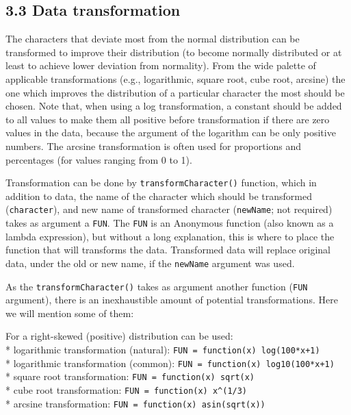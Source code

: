\documentclass[
]{article}
\begin{document}
\hypertarget{data-transformation}{%
\subsection{3.3 Data transformation}\label{data-transformation}}

The characters that deviate most from the normal distribution can be
transformed to improve their distribution (to become normally
distributed or at least to achieve lower deviation from normality). From
the wide palette of applicable transformations (e.g., logarithmic,
square root, cube root, arcsine) the one which improves the distribution
of a particular character the most should be chosen. Note that, when
using a log transformation, a constant should be added to all values to
make them all positive before transformation if there are zero values in
the data, because the argument of the logarithm can be only positive
numbers. The arcsine transformation is often used for proportions and
percentages (for values ranging from 0 to 1).

Transformation can be done by \texttt{transformCharacter()} function,
which in addition to data, the name of the character which should be
transformed (\texttt{character}), and new name of transformed character
(\texttt{newName}; not required) takes as argument a \texttt{FUN}. The
\texttt{FUN} is an Anonymous function (also known as a lambda
expression), but without a long explanation, this is where to place the
function that will transforms the data. Transformed data will replace
original data, under the old or new name, if the \texttt{newName}
argument was used.

As the \texttt{transformCharacter()} takes as argument another function
(\texttt{FUN} argument), there is an inexhaustible amount of potential
transformations. Here we will mention some of them:

For a right-skewed (positive) distribution can be used:\\
* logarithmic transformation (natural):
\texttt{FUN\ =\ function(x)\ log(100*x+1)}\\
* logarithmic transformation (common):
\texttt{FUN\ =\ function(x)\ log10(100*x+1)}\\
* square root transformation: \texttt{FUN\ =\ function(x)\ sqrt(x)}\\
* cube root transformation: \texttt{FUN\ =\ function(x)\ x\^{}(1/3)}\\
* arcsine transformation: \texttt{FUN\ =\ function(x)\ asin(sqrt(x))}
\end{document}
